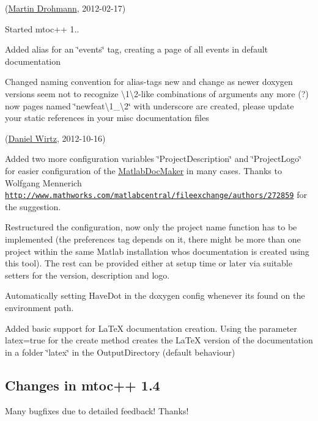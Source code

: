 \begin{DoxyRefList}
\item[\label{newfeat1_4__newfeat1_4000002}%
\hypertarget{newfeat1_4__newfeat1_4000002}{}%
Page \hyperlink{changes}{Changes and new features in mtoc++} ](\hyperlink{developers_md}{Martin Drohmann}, 2012-\/02-\/17)
\begin{DoxyItemize}
\item Started mtoc++ 1..
\item Added alias for an \char`\"{}events\char`\"{} tag, creating a page of all events in default documentation
\item Changed naming convention for alias-\/tags new and change as newer doxygen versions seem not to recognize \textbackslash{}1\textbackslash{}2-\/like combinations of arguments any more (?) now pages named \char`\"{}newfeat\textbackslash{}1\+\_\+\textbackslash{}2\char`\"{} with underscore are created, please update your static references in your misc documentation files 
\end{DoxyItemize}
\item[\label{newfeat1_4__newfeat1_4000001}%
\hypertarget{newfeat1_4__newfeat1_4000001}{}%
Class \hyperlink{class_matlab_doc_maker}{Matlab\+Doc\+Maker} ](\hyperlink{developers_dw}{Daniel Wirtz}, 2012-\/10-\/16)
\begin{DoxyItemize}
\item Added two more configuration variables \char`\"{}\+Project\+Description\char`\"{} and \char`\"{}\+Project\+Logo\char`\"{} for easier configuration of the \hyperlink{class_matlab_doc_maker}{Matlab\+Doc\+Maker} in many cases. Thanks to Wolfgang Mennerich \href{http://www.mathworks.com/matlabcentral/fileexchange/authors/272859}{\tt http\+://www.\+mathworks.\+com/matlabcentral/fileexchange/authors/272859} for the suggestion.
\item Restructured the configuration, now only the project name function has to be implemented (the preferences tag depends on it, there might be more than one project within the same Matlab installation whos documentation is created using this tool). The rest can be provided either at setup time or later via suitable setters for the version, description and logo.
\item Automatically setting Have\+Dot in the doxygen config whenever its found on the environment path.
\item Added basic support for La\+Te\+X documentation creation. Using the parameter {\ttfamily latex}=true for the create method creates the La\+Te\+X version of the documentation in a folder \char`\"{}latex\char`\"{} in the Output\+Directory (default behaviour)
\end{DoxyItemize}
\end{DoxyRefList}\hypertarget{changelog1_4}{}\subsection{Changes in mtoc++ 1.4}\label{changelog1_4}
Many bugfixes due to detailed feedback! Thanks!


